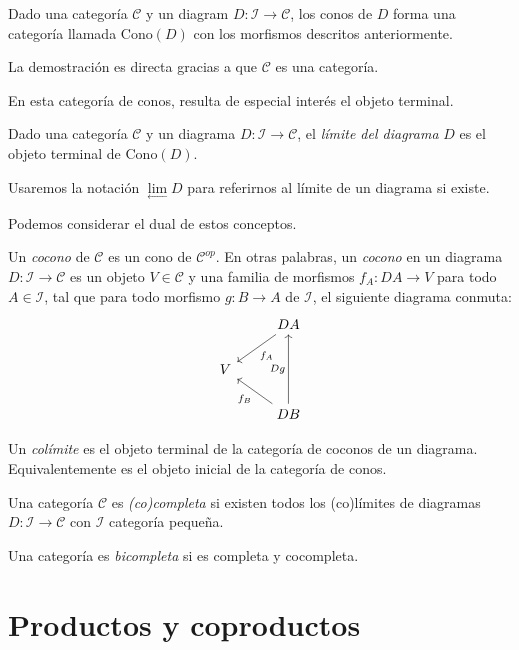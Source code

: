 \documentclass[12pt, twoside]{book}
\newcommand{\cat}{{\mathcal{C}}}
\begin{document}
\begin{proposition}
Dado una categoría $\cat$ y un diagram $D \colon \mathcal{I} \to \cat$, los conos de $D$ forma una categoría llamada $\text{Cono}(D)$ con los morfismos descritos anteriormente.
\end{proposition}
La demostración es directa gracias a que $\cat$ es una categoría.

En esta categoría de conos, resulta de especial interés el objeto terminal.

\begin{definition}
Dado una categoría $\cat$ y un diagrama $D \colon \mathcal{I} \to \cat$, el \emph{límite del diagrama} $D$ es el objeto terminal de $\text{Cono}(D)$.
\end{definition}

Usaremos la notación $\underset{\longleftarrow}\lim D$ para referirnos al límite de un diagrama si existe.

Podemos considerar el dual de estos conceptos.

\begin{definition}
Un \emph{cocono} de $\cat$ es un cono de $\cat^{op}$.
En otras palabras, un \emph{cocono} en un diagrama $D \colon \mathcal{I} \to \cat$ es un objeto $V \in \cat$ y una familia de morfismos $f_A \colon D A \to V$ para todo $A \in \mathcal{I}$, tal que para todo morfismo $g \colon B \to A$ de $\mathcal{I}$, el siguiente diagrama conmuta:
\[ \begin{tikzcd}
 & D A \arrow[dl,"f_A"]\\
V\\
 & D B \arrow[ul,"f_B"] \arrow[uu,"D g"]
\end{tikzcd} \]
\end{definition}

\begin{definition}
Un \emph{colímite} es el objeto terminal de la categoría de coconos de un diagrama. Equivalentemente es el objeto inicial de la categoría de conos.
\end{definition}

\begin{definition}
Una categoría $\cat$ es \emph{(co)completa} si existen todos los (co)límites de diagramas $D \colon \mathcal{I} \to \cat$ con $\mathcal{I}$ categoría pequeña.

Una categoría es \emph{bicompleta} si es completa y cocompleta.
\end{definition}

\section{Productos y coproductos}
\end{document}
